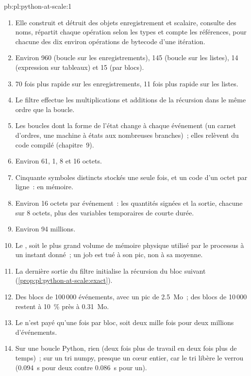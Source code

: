 \begin{solution}{pb:pl:python-at-scale:1}
\begin{enumerate}
\item Elle construit et détruit des objets enregistrement et scalaire, consulte des noms, répartit chaque opération selon les types et compte les références,
pour chacune des dix environ opérations de bytecode d'une itération.
\item Environ 960 (boucle sur les enregistrements), 145 (boucle sur les listes), 14 (expression sur tableaux) et 15 (par blocs).
\item 70 fois plus rapide sur les enregistrements, 11 fois plus rapide sur les listes.
\item Le filtre effectue les multiplications et additions de la récursion dans le même ordre que la boucle.
\item Les boucles dont la forme de l'état change à chaque événement (un carnet d'ordres, une machine à états aux nombreuses branches)~; elles relèvent du code compilé
(chapitre~9).
\item Environ 61, 1, 8 et 16 octets.
\item Cinquante symboles distincts stockés une seule fois, et un code d'un octet par ligne~:  en mémoire.
\item Environ 16 octets par événement~: les quantités signées et la sortie, chacune sur 8 octets, plus des variables temporaires de courte durée.
\item Environ 94 millions.
\item Le , soit le plus grand volume de mémoire physique utilisé par le processus à un instant donné~; un job est tué à son pic, non à sa moyenne.
\item La dernière sortie du filtre initialise la récursion du bloc suivant (\cref{prop:pl:python-at-scale:exact}).
\item Des blocs de 100\,000 événements, avec un pic de 2.5~Mo~; des blocs de 10\,000 restent à 10~\% près à 0.31~Mo.
\item Le  n'est payé qu'une fois par bloc, soit deux mille fois pour deux millions d'événements.
\item Sur une boucle Python, rien (deux fois plus de travail en deux fois plus de temps)~; sur un tri numpy, presque un cœur entier, car le tri libère le verrou
(0.094~s pour deux contre 0.086~s pour un).

\end{enumerate}
\end{solution}
